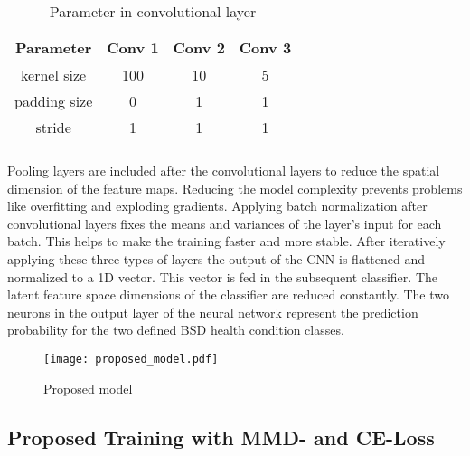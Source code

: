 \begin{longtable}{c c c c} 
\toprule
Parameter & Conv 1 & Conv 2 & Conv 3 \\
\midrule
kernel size & 100 & 10 & 5 \\

padding size & 0 & 1 & 1 \\

stride & 1 & 1 & 1 \\
\bottomrule
\caption {Parameter in convolutional layer}
\label {tab:parameter_conv}
\end{longtable}

Pooling layers are included after the convolutional layers to reduce the spatial dimension of the feature maps. Reducing the model complexity prevents problems like overfitting and exploding gradients. Applying batch normalization after convolutional layers fixes the means and variances of the layer's input for each batch. This helps to make the training faster and more stable. After iteratively applying these three types of layers the output of the CNN is flattened and normalized to a 1D vector. This vector is fed in the subsequent classifier. The latent feature space dimensions of the classifier are reduced constantly. The two neurons in the output layer of the neural network represent the prediction probability for the two defined BSD health condition classes.


\begin{figure}[H]
  \centering
  \texttt{[image: proposed\_model.pdf]}
  \caption {Proposed model} \label{fig:proposed_model}
\end{figure}


\subsection{Proposed Training with MMD- and CE-Loss} \label{sec:Proposed_training}

